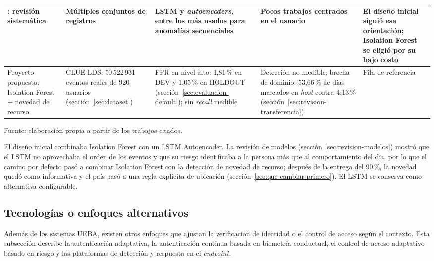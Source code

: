 {\begin{longtable}{>{\raggedright\arraybackslash}p{2.2cm}>{\raggedright\arraybackslash}p{2.6cm}>{\raggedright\arraybackslash}p{2.6cm}>{\raggedright\arraybackslash}p{2.7cm}>{\raggedright\arraybackslash}p{3.5cm}}
	\hline
	\textcite{Landauer2023Survey}: revisión sistemática & Múltiples conjuntos de registros & LSTM y \emph{autoencoders}, entre los más usados para anomalías secuenciales & Pocos trabajos centrados en el usuario & El diseño inicial siguió esa orientación; Isolation Forest se eligió por su bajo costo \parencite{Liu2008} \\
	\hline
	Proyecto propuesto: Isolation Forest + novedad de recurso & CLUE-LDS: 50\,522\,931 eventos reales de 920 usuarios (sección~\ref{sec:dataset}) & FPR en nivel alto: 1,81\,\% en DEV y 1,05\,\% en HOLDOUT (sección~\ref{sec:evaluacion-default}); sin \emph{recall} medible & Detección no medible; brecha de dominio: 53,66\,\% de días marcados en \emph{host} contra 4,13\,\% (sección~\ref{sec:revision-transferencia}) & Fila de referencia \\
	\hline
\end{longtable}
}
{\small Fuente: elaboración propia a partir de los trabajos citados.\par}

El diseño inicial combinaba Isolation Forest con un LSTM Autoencoder. La revisión de modelos (sección~\ref{sec:revision-modelos}) mostró que el LSTM no aprovechaba el orden de los eventos y que su riesgo identificaba a la persona más que al comportamiento del día, por lo que el camino por defecto pasó a combinar Isolation Forest con la detección de novedad de recurso; después de la entrega del 90\,\%, la novedad quedó como informativa y el país pasó a una regla explícita de ubicación (sección~\ref{sec:que-cambiar-primero}). El LSTM se conserva como alternativa configurable.

\subsection{Tecnologías o enfoques alternativos}

Además de los sistemas UEBA, existen otros enfoques que ajustan la verificación de identidad o el control de acceso según el contexto. Esta subsección describe la autenticación adaptativa, la autenticación continua basada en biometría conductual, el control de acceso adaptativo basado en riesgo y las plataformas de detección y respuesta en el \emph{endpoint}.

